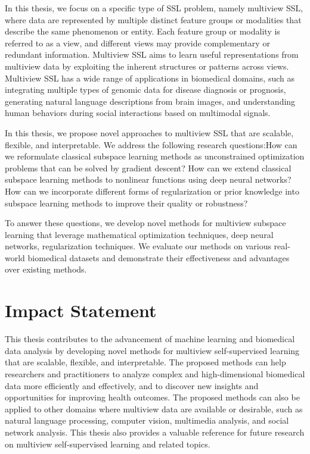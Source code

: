 \documentclass{report}
\numberwithin{figure}{chapter}
\numberwithin{table}{section}
\begin{document}
In this thesis, we focus on a specific type of SSL problem, namely multiview SSL, where data are represented by multiple distinct feature groups or modalities that describe the same phenomenon or entity. Each feature group or modality is referred to as a view, and different views may provide complementary or redundant information. Multiview SSL aims to learn useful representations from multiview data by exploiting the inherent structures or patterns across views. Multiview SSL has a wide range of applications in biomedical domains, such as integrating multiple types of genomic data for disease diagnosis or prognosis, generating natural language descriptions from brain images, and understanding human behaviors during social interactions based on multimodal signals.

In this thesis, we propose novel approaches to multiview SSL that are scalable, flexible, and interpretable. We address the following research questions:How can we reformulate classical subspace learning methods as unconstrained optimization problems that can be solved by gradient descent? How can we extend classical subspace learning methods to nonlinear functions using deep neural networks? How can we incorporate different forms of regularization or prior knowledge into subspace learning methods to improve their quality or robustness?

To answer these questions, we develop novel methods for multiview subspace learning that leverage mathematical optimization techniques, deep neural networks, regularization techniques. We evaluate our methods on various real-world biomedical datasets and demonstrate their effectiveness and advantages over existing methods.

\newpage
\chapter*{Impact Statement} %

This thesis contributes to the advancement of machine learning and biomedical data analysis by developing novel methods for multiview self-supervised learning that are scalable, flexible, and interpretable. The proposed methods can help researchers and practitioners to analyze complex and high-dimensional biomedical data more efficiently and effectively, and to discover new insights and opportunities for improving health outcomes. The proposed methods can also be applied to other domains where multiview data are available or desirable, such as natural language processing, computer vision, multimedia analysis, and social network analysis. This thesis also provides a valuable reference for future research on multiview self-supervised learning and related topics.
\end{document}
